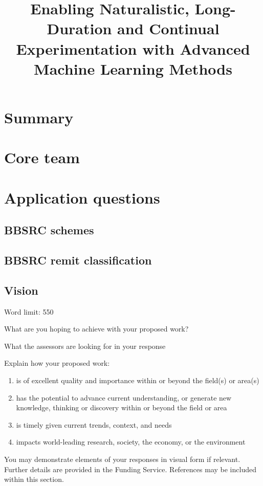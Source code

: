 \documentclass[12pt]{article}
\title{Enabling Naturalistic, Long-Duration and Continual Experimentation with
Advanced Machine Learning Methods}
\newenvironment{instruction}{\par\color{red}}{\par}
\begin{document}

\section{Summary}



\pagebreak
\section{Core team}



\pagebreak
\section{Application questions}

\subsection{BBSRC schemes}



\pagebreak
\subsection{BBSRC remit classification}



\pagebreak
\subsection{Vision}
\begin{instruction}
Word limit: 550

What are you hoping to achieve with your proposed work?

What the assessors are looking for in your response

Explain how your proposed work:

\begin{enumerate}

    \item is of excellent quality and importance within or beyond the field(s) or area(s)

    \item has the potential to advance current understanding, or generate new
knowledge, thinking or discovery within or beyond the field or area

    \item is timely given current trends, context, and needs

    \item impacts world-leading research, society, the economy, or the environment

\end{enumerate}

You may demonstrate elements of your responses in visual form if relevant.
Further details are provided in the Funding Service.
References may be included within this section.
\end{instruction}
\end{document}

